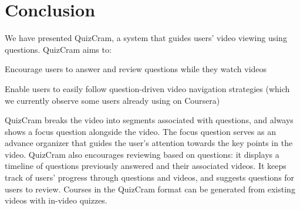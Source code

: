 \documentclass{sigchi}
\begin{document}


\section{Conclusion}
We have presented QuizCram, a system that guides users' video viewing using questions. QuizCram aims to:

\begin{compactenum}
\item Encourage users to answer and review questions while they watch videos
\item Enable users to easily follow question-driven video navigation strategies (which we currently observe some users already using on Coursera)
\end{compactenum}

QuizCram breaks the video into segments associated with questions, and always shows a focus question alongside the video. The focus question serves as an advance organizer that guides the user's attention towards the key points in the video. QuizCram also encourages reviewing based on questions: it displays a timeline of questions previously answered and their associated videos. It keeps track of users' progress through questions and videos, and suggests questions for users to review. Courses in the QuizCram format can be generated from existing videos with in-video quizzes. %
\end{document}
